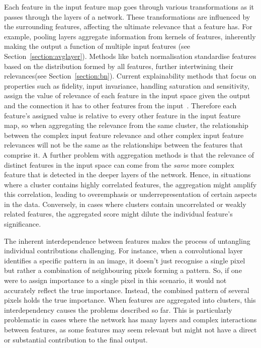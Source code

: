 Each feature in the input feature map goes through various transformations as it passes through the layers of a network. These transformations are influenced by the surrounding features, affecting the ultimate relevance that a feature has. For example, pooling layers aggregate information from kernels of features, inherently making the output a function of multiple input features (see Section~\ref{section:avglayer}). Methods like batch normalisation standardise features based on the distribution formed by all features, further intertwining their relevances(see Section~\ref{section:bn}). Current explainability methods that focus on properties such as fidelity, input invariance, handling saturation and sensitivity, assign the value of relevance of each feature in the input space given the output and the connection it has to other features from the input~\cite{SimonyanVZ13, SimonyanVZ13, SpringenbergDBR14, bach2015pixel, SelvarajuCDVPB20, SelvarajuCDVPB20, ChattopadhyaySH18, abs-1908-01224, SmilkovTKVW17, bach2015pixel}. Therefore each feature's assigned value is relative to every other feature in the input feature map, so when aggregating the relevance from the same cluster, the relationship between the complex input feature relevance and other complex input feature relevances will not be the same as the relationships between the features that comprise it. A further problem with aggregation methods is that the relevance of distinct features in the input space can come from the \textit{same} more complex feature that is detected in the deeper layers of the network. Hence, in situations where a cluster contains highly correlated features, the aggregation might amplify this correlation, leading to overemphasis or underrepresentation of certain aspects in the data. Conversely, in cases where clusters contain uncorrelated or weakly related features, the aggregated score might dilute the individual feature's significance.

The inherent interdependence between features makes the process of untangling individual contributions challenging. For instance, when a convolutional layer identifies a specific pattern in an image, it doesn't just recognise a single pixel but rather a combination of neighbouring pixels forming a pattern. So, if one were to assign importance to a single pixel in this scenario, it would not accurately reflect the true importance. Instead, the combined pattern of several pixels holds the true importance. When features are aggregated into clusters, this interdependency causes the problems described so far. This is particularly problematic in cases where the network has many layers and complex interactions between features, as some features may seem relevant but might not have a direct or substantial contribution to the final output.

